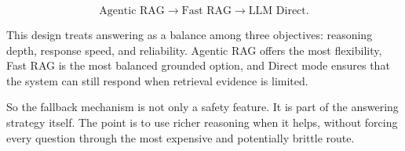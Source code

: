 \begin{equation}
\text{Agentic RAG} \rightarrow \text{Fast RAG} \rightarrow \text{LLM Direct}.
\end{equation}

This design treats answering as a balance among three objectives: reasoning depth, response speed, and reliability. Agentic RAG offers the most flexibility, Fast RAG is the most balanced grounded option, and Direct mode ensures that the system can still respond when retrieval evidence is limited.

So the fallback mechanism is not only a safety feature. It is part of the answering strategy itself. The point is to use richer reasoning when it helps, without forcing every question through the most expensive and potentially brittle route.
